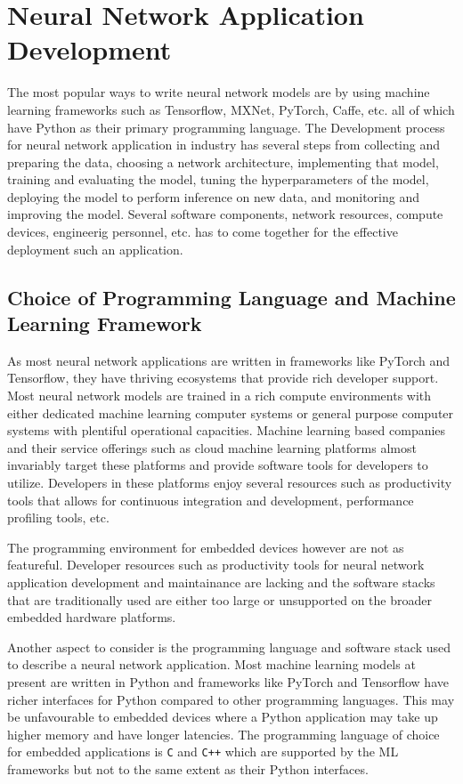 \section{Neural Network Application Development}

The most popular ways to write neural network models are by using machine learning frameworks such as Tensorflow, MXNet, PyTorch, Caffe, etc. all of which have Python as their primary programming language. The Development process for neural network application in industry has several steps from collecting and preparing the data, choosing a network architecture, implementing that model, training and evaluating the model, tuning the hyperparameters of the model, deploying the model to perform inference on new data, and monitoring and improving the model. Several software components, network resources, compute devices, engineerig personnel, etc. has to come together for the effective deployment such an application.

\subsection{Choice of Programming Language and Machine Learning Framework}

As most neural network applications are written in frameworks like PyTorch and Tensorflow, they have thriving ecosystems that provide rich developer support. Most neural network models are trained in a rich compute environments with either dedicated machine learning computer systems or general purpose computer systems with plentiful operational capacities. Machine learning based companies and their service offerings such as cloud machine learning platforms almost invariably target these platforms and provide software tools for developers to utilize. Developers in these platforms enjoy several resources such as productivity tools that allows for continuous integration and development, performance profiling tools, etc.


The programming environment for embedded devices however are not as featureful. Developer resources such as productivity tools for neural network application development and maintainance are lacking and the software stacks that are traditionally used are either too large or unsupported on the broader embedded hardware platforms.

Another aspect to consider is the programming language and software stack used to describe a neural network application. Most machine learning models at present are written in Python and frameworks like PyTorch and Tensorflow have richer interfaces for Python compared to other programming languages. This may be unfavourable to embedded devices where a Python application may take up higher memory and have longer latencies. The programming language of choice for embedded applications is \texttt{C} and \texttt{C++} which are supported by the ML frameworks but not to the same extent as their Python interfaces.

